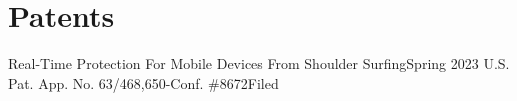 \section{Patents}
  \CVSubHeadingListStart
    \CVSubheading
      {Real-Time Protection For Mobile Devices From Shoulder Surfing}{Spring 2023}
      {U.S. Pat. App. No. 63/468,650-Conf. \#8672}{Filed}
  \CVSubHeadingListEnd